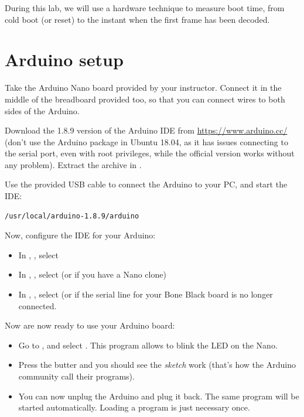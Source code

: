 
During this lab, we will use a hardware technique to measure boot time,
from cold boot (or reset) to the instant when the first frame has been
decoded.

\section{Arduino setup}

Take the Arduino Nano board provided by your instructor. Connect it in
the middle of the breadboard provided too, so that you can connect
wires to both sides of the Arduino.

Download the 1.8.9 version of the Arduino IDE from
\url{https://www.arduino.cc/} (don't use the Arduino
package in Ubuntu 18.04, as it has issues connecting to the serial port,
even with root privileges, while the official version works without any problem).
Extract the archive in .

Use the provided USB cable to connect the Arduino to your PC, and start the IDE:

\begin{verbatim}
/usr/local/arduino-1.8.9/arduino
\end{verbatim}

Now, configure the IDE for your Arduino:
\begin{itemize}
\item In , , select 
\item In , , select  (or
       if you have a Nano clone)
\item In , , select  (or
       if the serial line for your Bone Black board is no longer
      connected.
\end{itemize}

Now are now ready to use your Arduino board:
\begin{itemize}
\item Go to ,  and select .
      This program allows to blink the LED on the Nano.
\item Press the  butter and you should see the {\em sketch} work
(that's how the Arduino community call their programs).
\item You can now unplug the Arduino and plug it back. The same program
will be started automatically. Loading a program is just necessary once.
\end{itemize}

